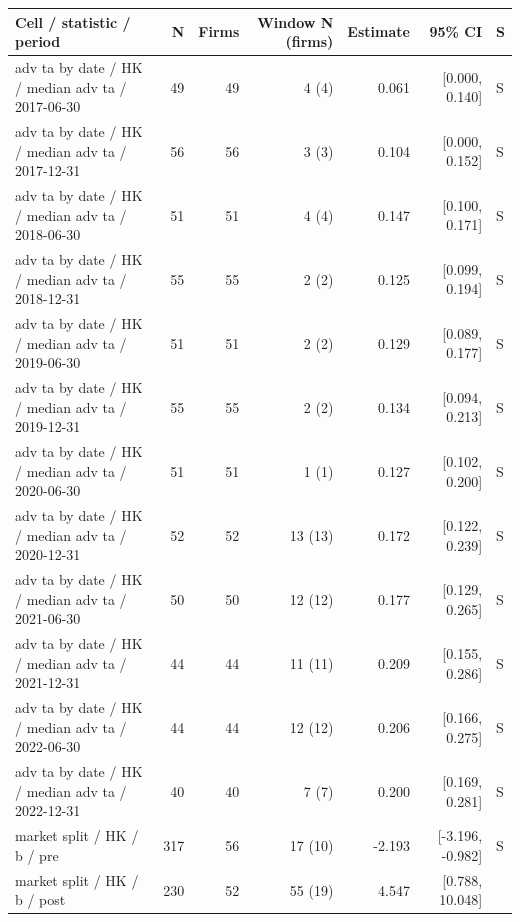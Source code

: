 \begin{threeparttable}
\begin{tabular}{p{5.7cm}rrrrrl}
\toprule
Cell / statistic / period & N & Firms & Window N (firms) & Estimate & 95\% CI & S \\
\midrule
adv ta by date / HK / median adv ta / 2017-06-30 & 49 & 49 & 4 (4) & 0.061 & [0.000, 0.140] & S \\
adv ta by date / HK / median adv ta / 2017-12-31 & 56 & 56 & 3 (3) & 0.104 & [0.000, 0.152] & S \\
adv ta by date / HK / median adv ta / 2018-06-30 & 51 & 51 & 4 (4) & 0.147 & [0.100, 0.171] & S \\
adv ta by date / HK / median adv ta / 2018-12-31 & 55 & 55 & 2 (2) & 0.125 & [0.099, 0.194] & S \\
adv ta by date / HK / median adv ta / 2019-06-30 & 51 & 51 & 2 (2) & 0.129 & [0.089, 0.177] & S \\
adv ta by date / HK / median adv ta / 2019-12-31 & 55 & 55 & 2 (2) & 0.134 & [0.094, 0.213] & S \\
adv ta by date / HK / median adv ta / 2020-06-30 & 51 & 51 & 1 (1) & 0.127 & [0.102, 0.200] & S \\
adv ta by date / HK / median adv ta / 2020-12-31 & 52 & 52 & 13 (13) & 0.172 & [0.122, 0.239] & S \\
adv ta by date / HK / median adv ta / 2021-06-30 & 50 & 50 & 12 (12) & 0.177 & [0.129, 0.265] & S \\
adv ta by date / HK / median adv ta / 2021-12-31 & 44 & 44 & 11 (11) & 0.209 & [0.155, 0.286] & S \\
adv ta by date / HK / median adv ta / 2022-06-30 & 44 & 44 & 12 (12) & 0.206 & [0.166, 0.275] & S \\
adv ta by date / HK / median adv ta / 2022-12-31 & 40 & 40 & 7 (7) & 0.200 & [0.169, 0.281] & S \\
market split / HK / b / pre & 317 & 56 & 17 (10) & -2.193 & [-3.196, -0.982] & S \\
market split / HK / b / post & 230 & 52 & 55 (19) & 4.547 & [0.788, 10.048] &  \\
\bottomrule
\end{tabular}
\begin{tablenotes}[flushleft]\footnotesize

\end{tablenotes}
\end{threeparttable}
